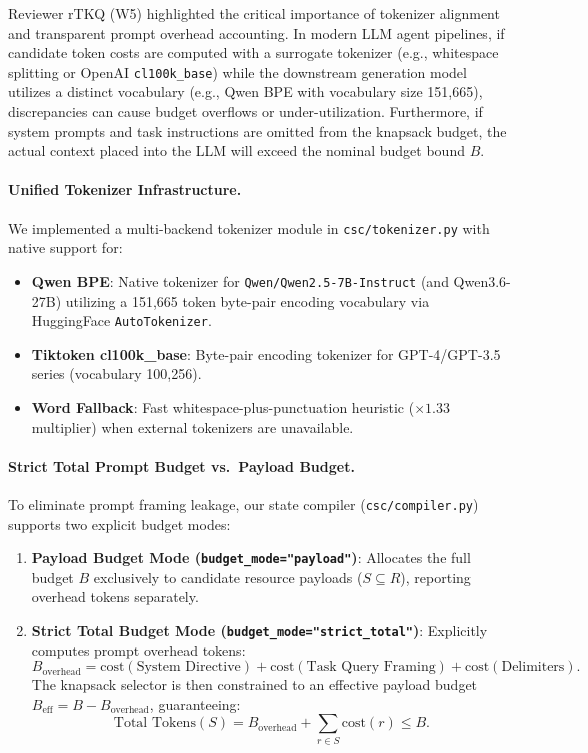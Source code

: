 \documentclass{article}
\begin{document}
Reviewer rTKQ (W5) highlighted the critical importance of tokenizer alignment and transparent prompt overhead accounting. In modern LLM agent pipelines, if candidate token costs are computed with a surrogate tokenizer (e.g., whitespace splitting or OpenAI \texttt{cl100k\_base}) while the downstream generation model utilizes a distinct vocabulary (e.g., Qwen BPE with vocabulary size 151,665), discrepancies can cause budget overflows or under-utilization. Furthermore, if system prompts and task instructions are omitted from the knapsack budget, the actual context placed into the LLM will exceed the nominal budget bound $B$.

\paragraph{Unified Tokenizer Infrastructure.} We implemented a multi-backend tokenizer module in \texttt{csc/tokenizer.py} with native support for:
\begin{itemize}
    \item \textbf{Qwen BPE}: Native tokenizer for \texttt{Qwen/Qwen2.5-7B-Instruct} (and Qwen3.6-27B) utilizing a 151,665 token byte-pair encoding vocabulary via HuggingFace \texttt{AutoTokenizer}.
    \item \textbf{Tiktoken cl100k\_base}: Byte-pair encoding tokenizer for GPT-4/GPT-3.5 series (vocabulary 100,256).
    \item \textbf{Word Fallback}: Fast whitespace-plus-punctuation heuristic ($\times 1.33$ multiplier) when external tokenizers are unavailable.
\end{itemize}

\paragraph{Strict Total Prompt Budget vs.\ Payload Budget.} To eliminate prompt framing leakage, our state compiler (\texttt{csc/compiler.py}) supports two explicit budget modes:
\begin{enumerate}
    \item \textbf{Payload Budget Mode (\texttt{budget\_mode="payload"})}: Allocates the full budget $B$ exclusively to candidate resource payloads ($S \subseteq R$), reporting overhead tokens separately.
    \item \textbf{Strict Total Budget Mode (\texttt{budget\_mode="strict\_total"})}: Explicitly computes prompt overhead tokens:
    \begin{equation}
    B_{\text{overhead}} = \text{cost}(\text{System Directive}) + \text{cost}(\text{Task Query Framing}) + \text{cost}(\text{Delimiters}).
    \end{equation}
    The knapsack selector is then constrained to an effective payload budget $B_{\text{eff}} = B - B_{\text{overhead}}$, guaranteeing:
    \begin{equation}
    \text{Total Tokens}(S) = B_{\text{overhead}} + \sum_{r \in S} \text{cost}(r) \leq B.
    \end{equation}
\end{enumerate}
\end{document}
